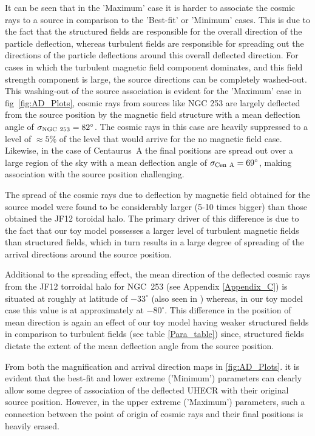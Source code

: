 \documentclass[usenatbib]{mnras}
\begin{document}
It can be seen that in the 'Maximum' case it is harder to associate the cosmic rays to a source in comparison to the 'Best-fit' or 'Minimum' cases. This is due to the fact that the structured fields are responsible for the overall direction of the particle deflection, whereas turbulent fields are responsible for spreading out the directions of the particle deflections around this overall deflected direction. For cases in which the turbulent magnetic field component dominates, and this field strength component is large, the source directions can be completely washed-out.
This washing-out of the source association is evident for the 'Maximum' case in fig~\ref{fig:AD_Plots}, cosmic rays from sources like NGC 253 are largely deflected from the source position by the magnetic field structure with a mean deflection angle of $\sigma_{\rm NGC~253} = 82^{\circ}$. The cosmic rays in this case are heavily suppressed to a level of $\approx 5\%$ of the level that would arrive for the no magnetic field case. Likewise, in the case of Centaurus~A the final positions are spread out over a large region of the sky with a mean deflection angle of $\sigma_{\rm Cen~A} = 69^{\circ}$, making association with the source position challenging.

The spread of the cosmic rays due to deflection by magnetic field obtained for
the source model were found to be considerably larger (5-10 times bigger) than those obtained the JF12 toroidal halo. The primary driver of this difference is due to the fact that our toy model possesses a larger level of turbulent magnetic fields than structured fields, which in turn results in a large degree of spreading of the arrival directions around the source position. 

Additional to the spreading effect, the mean direction of the deflected cosmic rays from the JF12 torroidal halo for NGC~253 (see Appendix \ref{Appendix_C}) is situated at roughly at latitude of $-33^{\circ}$ (also seen in \cite{Arjen_2021}) whereas, in our toy model case this value is at approximately at $-80^{\circ}$. This difference in the position of mean direction is again an effect of our toy model having weaker structured fields in comparison to turbulent fields (see table \ref{Para_table}) since, structured fields dictate the extent of the mean deflection angle from the source position.

From both the magnification and arrival direction maps in \ref{fig:AD_Plots}. it is evident that the best-fit and lower extreme ('Minimum') parameters can clearly allow some degree of association of the deflected UHECR with their  original source position. However, in the upper extreme ('Maximum') parameters, such a connection between the point of origin of cosmic rays and their final positions is heavily erased. 
\end{document}
